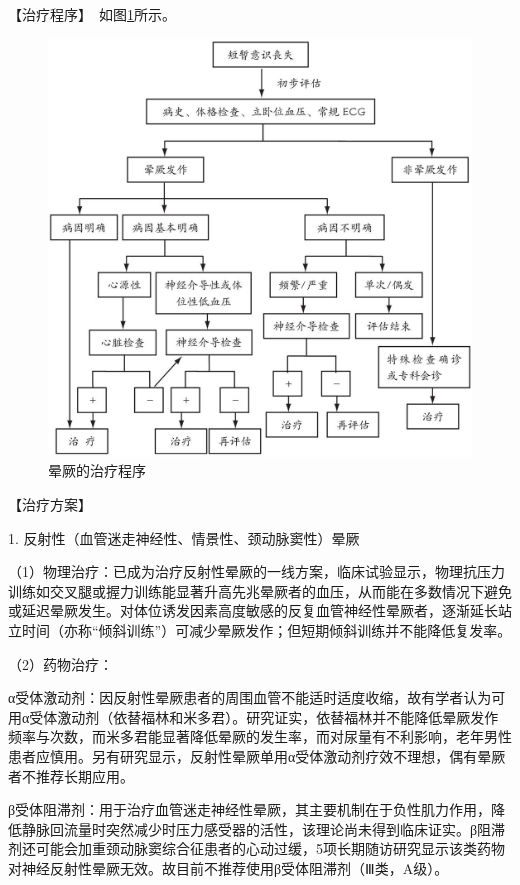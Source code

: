 【治疗程序】　如图\ref{fig2-6-1}所示。

\begin{figure}[!htbp]
 \centering
 \includegraphics{./images/Image00073.jpg}
 \captionsetup{justification=centering}
 \caption{晕厥的治疗程序}
 \label{fig2-6-1}
  \end{figure} 

【治疗方案】

1. 反射性（血管迷走神经性、情景性、颈动脉窦性）晕厥

（1）物理治疗：已成为治疗反射性晕厥的一线方案，临床试验显示，物理抗压力训练如交叉腿或握力训练能显著升高先兆晕厥者的血压，从而能在多数情况下避免或延迟晕厥发生。对体位诱发因素高度敏感的反复血管神经性晕厥者，逐渐延长站立时间（亦称“倾斜训练”）可减少晕厥发作；但短期倾斜训练并不能降低复发率。

（2）药物治疗：

α受体激动剂：因反射性晕厥患者的周围血管不能适时适度收缩，故有学者认为可用α受体激动剂（依替福林和米多君）。研究证实，依替福林并不能降低晕厥发作频率与次数，而米多君能显著降低晕厥的发生率，而对尿量有不利影响，老年男性患者应慎用。另有研究显示，反射性晕厥单用α受体激动剂疗效不理想，偶有晕厥者不推荐长期应用。

β受体阻滞剂：用于治疗血管迷走神经性晕厥，其主要机制在于负性肌力作用，降低静脉回流量时突然减少时压力感受器的活性，该理论尚未得到临床证实。β阻滞剂还可能会加重颈动脉窦综合征患者的心动过缓，5项长期随访研究显示该类药物对神经反射性晕厥无效。故目前不推荐使用β受体阻滞剂（Ⅲ类，A级）。

